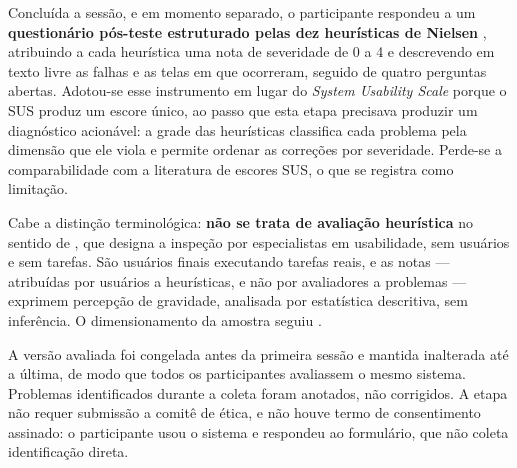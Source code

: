 Concluída a sessão, e em momento separado, o participante respondeu a um
\textbf{questionário pós-teste estruturado pelas dez heurísticas de Nielsen}
\citep{Nielsen1994}, atribuindo a cada heurística uma nota de severidade de 0 a 4 e
descrevendo em texto livre as falhas e as telas em que ocorreram, seguido de quatro
perguntas abertas. Adotou-se esse instrumento em lugar do \textit{System Usability Scale}
\citep{Brooke1996} porque o SUS produz um escore único, ao passo que esta etapa precisava
produzir um diagnóstico acionável: a grade das heurísticas classifica cada problema pela
dimensão que ele viola e permite ordenar as correções por severidade. Perde-se a
comparabilidade com a literatura de escores SUS, o que se registra como limitação.

Cabe a distinção terminológica: \textbf{não se trata de avaliação heurística} no sentido
de \cite{NielsenMolich1990}, que designa a inspeção por especialistas em usabilidade,
sem usuários e sem tarefas. São usuários finais executando tarefas reais, e as notas ---
atribuídas por usuários a heurísticas, e não por avaliadores a problemas --- exprimem
percepção de gravidade, analisada por estatística descritiva, sem inferência. O
dimensionamento da amostra seguiu \cite{NielsenLandauer1993}.

A versão avaliada foi congelada antes da primeira sessão e mantida inalterada até a
última, de modo que todos os participantes avaliassem o mesmo sistema. Problemas
identificados durante a coleta foram anotados, não corrigidos. A etapa não requer
submissão a comitê de ética, e não houve termo de consentimento assinado: o participante
usou o sistema e respondeu ao formulário, que não coleta identificação direta.
